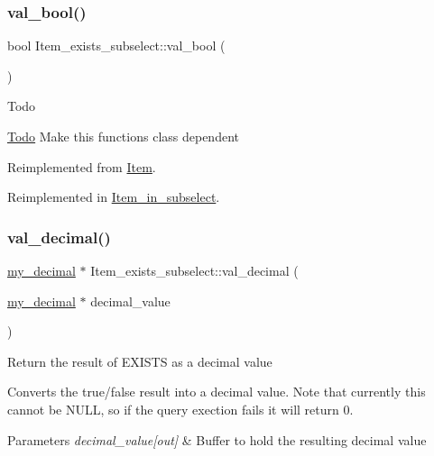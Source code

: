 \subsubsection{\texorpdfstring{val\+\_\+bool()}{val\_bool()}}
{\footnotesize\ttfamily bool Item\+\_\+exists\+\_\+subselect\+::val\+\_\+bool (\begin{DoxyParamCaption}{ }\end{DoxyParamCaption})\hspace{0.3cm}{\ttfamily [virtual]}}

\begin{DoxyRefDesc}{Todo}
\item[\mbox{\hyperlink{todo__todo000026}{Todo}}]Make this functions class dependent \end{DoxyRefDesc}


Reimplemented from \mbox{\hyperlink{classItem_a875594d2b9d99ccff3863bfd435828f0}{Item}}.



Reimplemented in \mbox{\hyperlink{classItem__in__subselect_a137eef270a78238c1bafde29071cbbcb}{Item\+\_\+in\+\_\+subselect}}.

\mbox{\label{classItem__exists__subselect_aa9f79b931ce496a3f4f962c2f325bee6}} 
\subsubsection{\texorpdfstring{val\+\_\+decimal()}{val\_decimal()}}
{\footnotesize\ttfamily \mbox{\hyperlink{classmy__decimal}{my\+\_\+decimal}} $\ast$ Item\+\_\+exists\+\_\+subselect\+::val\+\_\+decimal (\begin{DoxyParamCaption}\item[{\mbox{\hyperlink{classmy__decimal}{my\+\_\+decimal}} $\ast$}]{decimal\+\_\+value }\end{DoxyParamCaption})\hspace{0.3cm}{\ttfamily [virtual]}}

Return the result of E\+X\+I\+S\+TS as a decimal value

Converts the true/false result into a decimal value. Note that currently this cannot be N\+U\+LL, so if the query exection fails it will return 0.


\begin{DoxyParams}{Parameters}
{\em decimal\+\_\+value\mbox{[}out\mbox{]}} & Buffer to hold the resulting decimal value \\
\hline
\end{DoxyParams}


